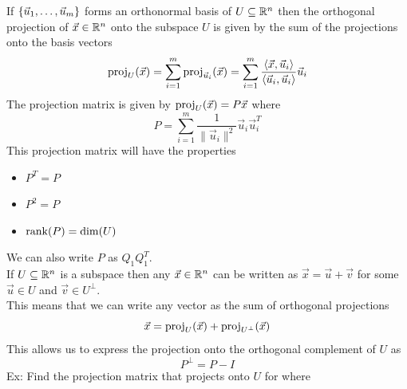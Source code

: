 \documentclass[11pt, fleqn]{article}
\begin{document}
If $\left\{ \vec{u}_1,\ldots,\vec{u}_m \right\}$ forms an orthonormal basis of $U\subseteq\mathbb{R}^n$ then the orthogonal projection of $\vec{x}\in\mathbb{R}^n$ onto the subspace $U$ is given by the sum of the projections onto the basis vectors
$$\operatorname{proj}_{U}(\vec{x})=\sum_{i=1}^m\operatorname{proj}_{\vec{u}_i}(\vec{x})=\sum_{i=1}^m\frac{\left\langle \vec{x},\vec{u}_i \right\rangle}{\left\langle \vec{u}_i,\vec{u}_i \right\rangle}\vec{u}_i$$
The projection matrix is given by $\operatorname{proj}_U(\vec{x})=P\vec{x}$ where
$$P=\sum_{i=1}^m\frac{1}{\|\vec{u}_i\|^2}\vec{u}_i\vec{u}_i^T$$
This projection matrix will have the properties
\begin{itemize}
    \item $P^T=P$
    \item $P^2=P$
    \item $\operatorname{rank}(P)=\dim(U)$
\end{itemize}
We can also write $P$ as $Q_1Q_1^T$.\\
If $U\subseteq\mathbb{R}^n$ is a subspace then any $\vec{x}\in\mathbb{R}^n$ can be written as $\vec{x}=\vec{u}+\vec{v}$ for some $\vec{u}\in U$ and $\vec{v}\in U^\perp$.\\
This means that we can write any vector as the sum of orthogonal projections
$$\vec{x}=\operatorname{proj}_{U}(\vec{x})+\operatorname{proj}_{U^\perp}(\vec{x})$$
This allows us to express the projection onto the orthogonal complement of $U$ as
$$P^\perp=P-I$$
Ex: Find the projection matrix that projects onto $U$ for where
\end{document}

